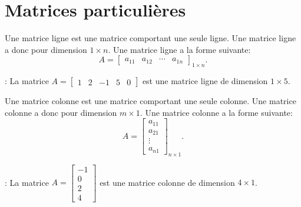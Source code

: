 \documentclass[12pt,a4paper]{book}
\numberwithin{definition}{chapter}
\theoremstyle{plain}
\begin{document}
\section{Matrices particulières}
\begin{definition}
 Une matrice ligne est une matrice comportant une seule ligne. Une matrice ligne a donc
 pour dimension $1\times n$. Une matrice ligne a la forme suivante:
 \begin{equation*}
 A=
 \begin{bmatrix}
 a_{11} & a_{12} & \cdots & a_{1n}
 \end{bmatrix}_{1\times n}.
 \end{equation*}
\end{definition}
\begin{example}: La matrice
 $
 A=
 \begin{bmatrix}
 1 & 2 & -1 & 5 & 0
 \end{bmatrix}
 $ est une matrice ligne de dimension $1\times 5$.
\end{example}
\begin{definition}
 Une matrice colonne est une matrice comportant une seule colonne.  Une matrice colonne a donc
 pour dimension $m\times 1$. Une matrice colonne a la forme suivante:
 \begin{equation*}
 A=\begin{bmatrix}
 a_{11}  \\
 a_{21}  \\
 \vdots  \\
 a_{n1}
 \end{bmatrix}_{n\times 1}.
 \end{equation*}
\end{definition}
\begin{example}: La matrice
 $
 A=
 \begin{bmatrix}
 -1 \\
 0 \\
 2 \\
 4
 \end{bmatrix}$ est une matrice colonne de dimension $4\times 1$.
\end{example}
\end{document}
